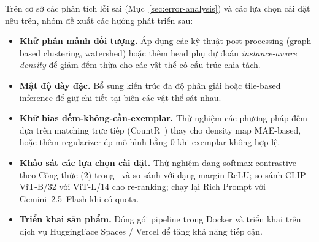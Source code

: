 \documentclass[a4paper,12pt]{report}
\numberwithin{figure}{chapter}
\numberwithin{table}{chapter}
\begin{document}
Trên cơ sở các phân tích lỗi sai (Mục~\ref{sec:error-analysis}) và các lựa chọn cài đặt nêu trên, nhóm đề xuất các hướng phát triển sau:

\begin{itemize}
    \item \textbf{Khử phân mảnh đối tượng.} Áp dụng các kỹ thuật post-processing (graph-based clustering, watershed) hoặc thêm head phụ dự đoán \textit{instance-aware density} để giảm đếm thừa cho các vật thể có cấu trúc chia tách.
    \item \textbf{Mật độ dày đặc.} Bổ sung kiến trúc đa độ phân giải hoặc tile-based inference để giữ chi tiết tại biên các vật thể sát nhau.
    \item \textbf{Khử bias đếm-không-cần-exemplar.} Thử nghiệm các phương pháp đếm dựa trên matching trực tiếp (CountR~\cite{countr}) thay cho density map MAE-based, hoặc thêm regularizer ép mô hình bằng 0 khi exemplar không hợp lệ.
    \item \textbf{Khảo sát các lựa chọn cài đặt.} Thử nghiệm dạng softmax contrastive theo Công thức (2) trong~\cite{vacount} và so sánh với dạng margin-ReLU; so sánh CLIP ViT-B/32 với ViT-L/14 cho re-ranking; chạy lại Rich Prompt với Gemini~2.5~Flash khi có quota.
    \item \textbf{Triển khai sản phẩm.} Đóng gói pipeline trong Docker và triển khai trên dịch vụ HuggingFace Spaces / Vercel để tăng khả năng tiếp cận.
\end{itemize}


\end{document}
